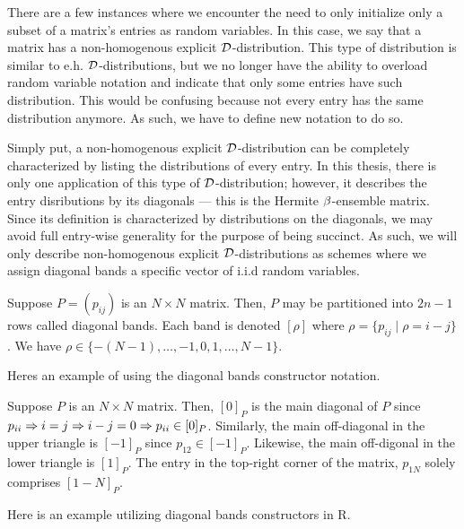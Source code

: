
There are a few instances where we encounter the need to only initialize only a subset of a matrix's entries as random variables. In this case, we say that a matrix has a non-homogenous explicit $\mathcal{D}$-distribution.
This type of distribution is similar to e.h. $\mathcal{D}$-distributions, but we no longer have the ability to overload random variable notation and indicate that only some entries have such distribution. This would be
confusing because not every entry has the same distribution anymore. As such, we have to define new notation to do so.

Simply put, a non-homogenous explicit $\mathcal{D}$-distribution can be completely characterized by listing the distributions of every entry.
In this thesis, there is only one application of this type of $\mathcal{D}$-distribution; however, it describes the entry disributions by its diagonals --- this is the Hermite $\beta$-ensemble matrix.
Since its definition is characterized by distributions on the diagonals, we may avoid full entry-wise generality for the purpose of being succinct.
As such, we will only describe non-homogenous explicit $\mathcal{D}$-distributions as schemes where we assign diagonal bands a specific vector of i.i.d random variables.

\begin{definition}
Suppose $P = (p_{ij})$ is an $N \times N$ matrix. Then, $P$ may be partitioned into $2n - 1$ rows called diagonal bands. Each band is denoted $[\rho]$ where $\rho = \{p_{ij} \mid \rho = i - j\}$. We have
$\rho \in \{ -(N-1), \dots, -1, 0, 1, \dots, N-1 \}$.
\end{definition}

Heres an example of using the diagonal bands constructor notation.

\begin{example}
Suppose $P$ is an $N \times N$ matrix. Then, $[0]_P$ is the main diagonal of $P$ since $p_{ii} \Rightarrow i = j \Rightarrow i - j = 0 \Rightarrow p_{ii} \in [0]_P$.
Similarly, the main off-diagonal in the upper triangle is $[-1]_P$ since $p_{12} \in [-1]_P$.
Likewise, the main off-digonal in the lower triangle is $[1]_P$. The entry in the top-right corner of the matrix, $p_{1N}$ solely comprises $[1 - N]_P$.
\end{example}

\begin{code}
Here is an example utilizing diagonal bands constructors in R.
\end{code}


